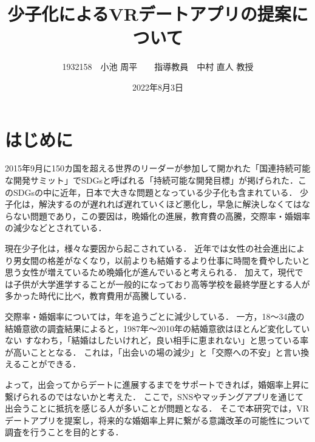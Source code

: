 \documentclass[12pt]{ltjsarticle}
\title{少子化によるVRデートアプリの提案について}
\author{1932158　小池 周平　　指導教員　中村 直人 教授}
\date{2022年8月3日}
\begin{document}
\maketitle

\section{はじめに}



2015年9月に150カ国を超える世界のリーダーが参加して開かれた「国連持続可能な開発サミット」でSDGsと呼ばれる「持続可能な開発目標」が掲げられた．このSDGsの中に近年，日本で大きな問題となっている少子化も含まれている．
少子化は，解決するのが遅れれば遅れていくほど悪化し，早急に解決しなくてはならない問題であり，この要因は，晩婚化の進展，教育費の高騰，交際率・婚姻率の減少などとされている．


現在少子化は，様々な要因から起こされている． %
近年では女性の社会進出により男女間の格差がなくなり，以前よりも結婚するより仕事に時間を費やしたいと思う女性が増えているため晩婚化が進んでいると考えられる\cite{sasaki2012}．
加えて，現代では子供が大学進学することが一般的になっており高等学校を最終学歴とする人が多かった時代に比べ，教育費用が高騰している．

交際率・婚姻率については，年を追うごとに減少している．
一方，18〜34歳の結婚意欲の調査結果によると，1987年〜2010年の結婚意欲はほとんど変化していない
すなわち，「結婚はしたいけれど，良い相手に恵まれない」と思っている率が高いこととなる．
これは，「出会いの場の減少」と「交際への不安」と言い換えることができる．

よって，出会ってからデートに進展するまでをサポートできれば，婚姻率上昇に繋げられるのではないかと考えた．
ここで，SNSやマッチングアプリを通じて出会うことに抵抗を感じる人が多いことが問題となる．
そこで本研究では，VRデートアプリを提案し，将来的な婚姻率上昇に繋がる意識改革の可能性について調査を行うことを目的とする．
\end{document}

